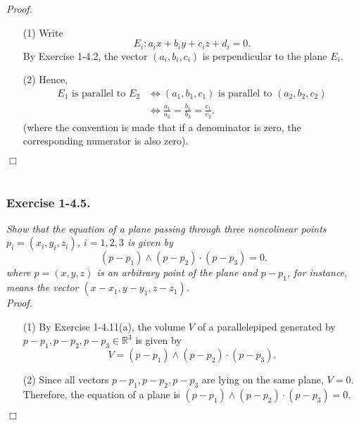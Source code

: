 \documentclass{article}
\begin{document}
\emph{Proof.}
\begin{enumerate}
\item[(1)]
  Write
  \[
    E_i: a_i x + b_i y + c_i z + d_i = 0.
  \]
  By Exercise 1-4.2,
  the vector $(a_i,b_i,c_i)$ is perpendicular to the plane $E_i$.

\item[(2)]
  Hence,
  \begin{align*}
    \text{$E_1$ is parallel to $E_2$}
    & \Longleftrightarrow
    \text{$(a_1,b_1,c_1)$ is parallel to $(a_2,b_2,c_2)$} \\
    & \Longleftrightarrow
    \frac{a_1}{a_2} = \frac{b_1}{b_2} = \frac{c_1}{c_2}.
  \end{align*}
  (where the convention is made that if a denominator is zero,
  the corresponding numerator is also zero).
\end{enumerate}
$\Box$ \\\\






\subsubsection*{Exercise 1-4.5.}
\emph{Show that the equation of a plane passing through three noncolinear points
$p_i = (x_i, y_i, z_i)$, $i = 1, 2, 3$ is given by
\[
  (p - p_1) \wedge (p - p_2) \cdot (p - p_3) = 0.
\]
where $p = (x, y, z)$ is an arbitrary point of the plane and $p - p_1$,
for instance,
means the vector $(x - x_1, y - y_1, z - z_1)$.} \\



\emph{Proof.}
\begin{enumerate}
\item[(1)]
  By Exercise 1-4.11(a),
  the volume $V$ of a parallelepiped generated by
  $p - p_1, p - p_2, p - p_3 \in \mathbb{R}^3$ is given by
  \[
    V = (p - p_1) \wedge (p - p_2) \cdot (p - p_3).
  \]

\item[(2)]
  Since all vectors $p - p_1, p - p_2, p - p_3$ are lying on the same plane,
  $V = 0$.
  Therefore, the equation of a plane is $(p - p_1) \wedge (p - p_2) \cdot (p - p_3) = 0$.
\end{enumerate}
$\Box$ \\\\
\end{document}
